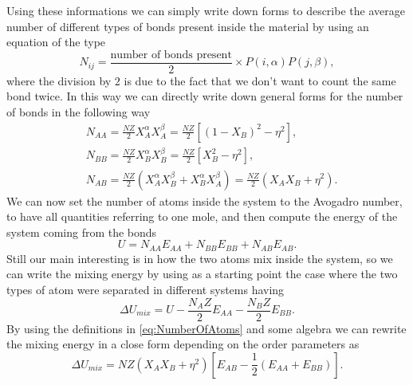 Using these informations we can simply write down forms to describe the average number of different types of bonds present inside the material by using an equation of the type
\begin{equation}
    N_{ij} = \frac{\text{number of bonds present}}{2} \times P(i, \alpha) P(j, \beta),
\end{equation}
where the division by $2$ is due to the fact that we don't want to count the same bond twice. In this way we can directly write down general forms for the number of bonds in the following way
\begin{align}
    \label{eq:NumberOfAtoms}
    &N_{AA} = \frac{NZ}{2}X_A^\alpha X_A^\beta = \frac{NZ}{2}\left[ (1 - X_B)^2 - \eta^2 \right],\\
    &N_{BB} = \frac{NZ}{2}X_B^\alpha X_B^\beta = \frac{NZ}{2}\left[ X_B^2 - \eta^2 \right],\\
    &N_{AB} = \frac{NZ}{2}\left( X_A^\alpha X_B^\beta + X_B^\alpha X_A^\beta\right) = \frac{NZ}{2}\left( X_AX_B + \eta^2 \right).
\end{align}
We can now set the number of atoms inside the system to the Avogadro number, to have all quantities referring to one mole, and then compute the energy of the system coming from the bonds
\begin{equation}
    U = N_{AA} E_{AA} + N_{BB} E_{BB} + N_{AB} E_{AB}.
\end{equation}
Still our main interesting is in how the two atoms mix inside the system, so we can write the mixing energy by using as a starting point the case where the two types of atom were separated in different systems having
\begin{equation}
    \Delta U_{mix} = U - \frac{N_A Z}{2}E_{AA} - \frac{N_B Z}{2}E_{BB}.
\end{equation}
By using the definitions in \eqref{eq:NumberOfAtoms} and some algebra we can rewrite the mixing energy in a close form depending on the order parameters as
\begin{equation}
    \Delta U_{mix} = NZ\left( X_AX_B + \eta^2 \right)\left[ E_{AB} - \frac{1}{2}\left(E_{AA} + E_{BB}\right) \right].
\end{equation}